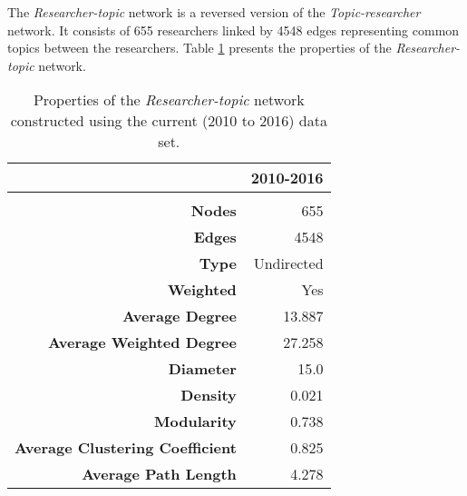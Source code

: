 The \textit{Researcher-topic} network is a reversed version of the \textit{Topic-researcher} network. It consists of 655 researchers linked by 4548 edges representing common topics between the researchers. Table \ref{table:researcher_a_properties} presents the properties of the \textit{Researcher-topic} network.

\begin{table}[htbp]
\centering
\caption[Properties of the \textit{Researcher-topic} network constructed using the current (2010 to 2016) data set]{Properties of the \textit{Researcher-topic} network constructed using the current (2010 to 2016) data set.}
\label{table:researcher_a_properties}
\begin{tabular}{r|r}
{} & \textbf{2010-2016}\\
\hline\\
\textbf{Nodes}                          & {655}\\
\textbf{Edges}                          & {4548}\\
\textbf{Type}                           & {Undirected}\\
\textbf{Weighted}                       & {Yes}\\
\textbf{Average Degree}                 & {13.887}\\
\textbf{Average Weighted Degree}        & {27.258}\\
\textbf{Diameter}                       & {15.0}\\
\textbf{Density}                        & {0.021}\\
\textbf{Modularity}                     & {0.738}\\
\textbf{Average Clustering Coefficient} & {0.825}\\
\textbf{Average Path Length}            & {4.278}\\
\end{tabular}
\end{table}

